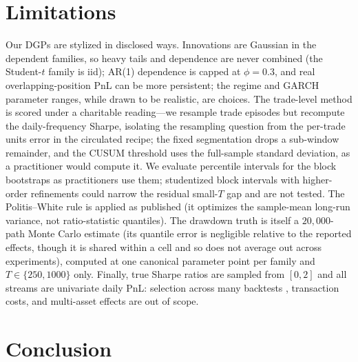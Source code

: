 \documentclass[11pt]{article}
\begin{document}
\section{Limitations}

Our DGPs are stylized in disclosed ways. Innovations are Gaussian in the
dependent families, so heavy tails and dependence are never combined (the
Student-$t$ family is iid); AR(1) dependence is capped at $\phi=0.3$, and
real overlapping-position PnL can be more persistent; the regime and GARCH
parameter ranges, while drawn to be realistic, are choices. The trade-level
method is scored under a charitable reading---we resample trade episodes but
recompute the daily-frequency Sharpe, isolating the resampling question from
the per-trade units error in the circulated recipe; the fixed segmentation
drops a sub-window remainder, and the CUSUM threshold uses the full-sample
standard deviation, as a practitioner would compute it. We evaluate percentile
intervals for the block bootstraps as practitioners use them; studentized
block intervals with higher-order refinements \citep{ledoit2008robust} could
narrow the residual small-$T$ gap and are not tested. The Politis--White rule
is applied as published (it optimizes the sample-mean long-run variance, not
ratio-statistic quantiles). The drawdown truth is itself a $20{,}000$-path
Monte Carlo estimate (its quantile error is negligible relative to the
reported effects, though it is shared within a cell and so does not average
out across experiments), computed at one canonical parameter point per family
and $T\in\{250,1000\}$ only. Finally, true Sharpe ratios are sampled from
$[0,2]$ and all streams are univariate daily PnL: selection across many
backtests \citep{white2000reality,bailey2014deflated}, transaction costs, and
multi-asset effects are out of scope.

\section{Conclusion}
\end{document}
